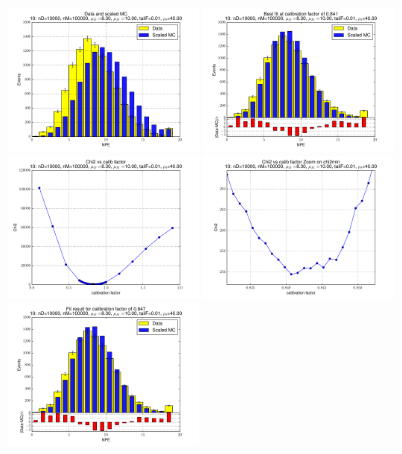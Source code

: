 
 \begin{figure}[htbp] \begin{center} 
\includegraphics[width=0.45\textwidth]{../FIGURES/10/FIG_Data_and_scaled_MC.pdf} 
\includegraphics[width=0.45\textwidth]{../FIGURES/10/FIG_Best_fit_at_calibration_factor_of_0_841.pdf} 
\includegraphics[width=0.45\textwidth]{../FIGURES/10/FIG_Chi2_vs_calib_factor.pdf} 
\includegraphics[width=0.45\textwidth]{../FIGURES/10/FIG_Chi2_vs_calib_factor_Zoom_on_chi2min.pdf} 
\includegraphics[width=0.45\textwidth]{../FIGURES/10/FIG_Fit_result_for_calibration_factor_of_0_847.pdf} 

\end{center}
\end{figure}
